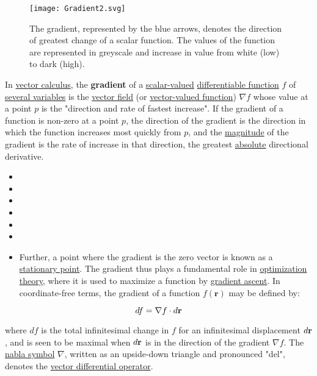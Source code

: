 \documentclass[
]{article}
\author{}
\date{}
\begin{document}
\begin{figure}
\centering
\texttt{[image: Gradient2.svg]}
\caption{The gradient, represented by the blue arrows, denotes the
direction of greatest change of a scalar function. The values of the
function are represented in greyscale and increase in value from white
(low) to dark (high).}
\end{figure}

In \href{vector_calculus}{vector calculus}, the \textbf{gradient} of a
\href{scalar-valued_function}{scalar-valued}
\href{differentiable_function}{differentiable function} \(f\) of
\href{Function_of_several_variables}{several variables} is the
\href{vector_field}{vector field} (or
\href{vector-valued_function}{vector-valued function}) \(\nabla f\)
whose value at a point \(p\) is the "direction and rate of fastest
increase". If the gradient of a function is non-zero at a point \(p\),
the direction of the gradient is the direction in which the function
increases most quickly from \(p\), and the
\href{magnitude_(mathematics)}{magnitude} of the gradient is the rate of
increase in that direction, the greatest \href{absolute_value}{absolute}
directional derivative.

\begin{itemize}
\item
\item
\item
\item
\item
\item
\item
  Further, a point where the gradient is the zero vector is known as a
  \href{stationary_point}{stationary point}. The gradient thus plays a
  fundamental role in \href{optimization_theory}{optimization theory},
  where it is used to maximize a function by
  \href{gradient_ascent}{gradient ascent}. In coordinate-free terms, the
  gradient of a function \(f(\mathbf{r})\) may be defined by:
\end{itemize}

\[df=\nabla f \cdot d\bf{r}\]

where \(df\) is the total infinitesimal change in \(f\) for an
infinitesimal displacement \(d\bf{r}\), and is seen to be maximal when
\(d\bf{r}\) is in the direction of the gradient \(\nabla f\). The
\href{nabla_symbol}{nabla symbol} \(\nabla\), written as an upside-down
triangle and pronounced "del", denotes the \href{Del}{vector
differential operator}.
\end{document}
